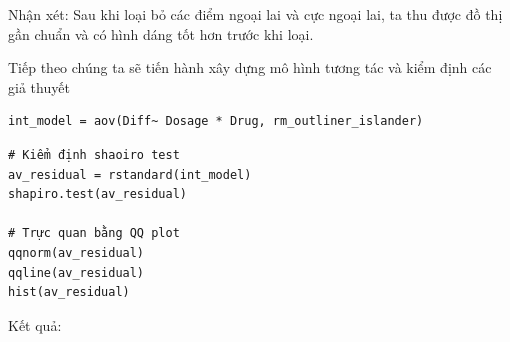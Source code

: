 Nhận xét: Sau khi loại bỏ các điểm ngoại lai và cực ngoại lai, ta thu được đồ thị gần chuẩn và có hình dáng tốt hơn trước khi loại.


Tiếp theo chúng ta sẽ tiến hành xây dựng mô hình tương tác và kiểm định các giả thuyết

\begin{lstlisting}
int_model = aov(Diff~ Dosage * Drug, rm_outliner_islander)
\end{lstlisting}

\begin{lstlisting}
# Kiểm định shaoiro test
av_residual = rstandard(int_model)
shapiro.test(av_residual)

# Trực quan bằng QQ plot
qqnorm(av_residual)
qqline(av_residual)
hist(av_residual)
\end{lstlisting}

Kết quả:

